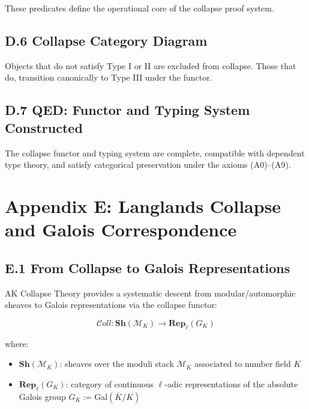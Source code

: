 \documentclass[11pt]{article}
\begin{document}
These predicates define the operational core of the collapse proof system.

\subsection*{D.6 Collapse Category Diagram}

\begin{center}
\end{center}

Objects that do not satisfy Type I or II are excluded from collapse.  
Those that do, transition canonically to Type III under the functor.

\subsection*{D.7 QED: Functor and Typing System Constructed}

The collapse functor and typing system are complete, compatible with dependent type theory, and satisfy categorical preservation under the axioms (A0)–(A9).



\appendix
\section*{Appendix E: Langlands Collapse and Galois Correspondence}

\subsection*{E.1 From Collapse to Galois Representations}

AK Collapse Theory provides a systematic descent from modular/automorphic sheaves to Galois representations via the collapse functor:

\[
\mathcal{C}oll : \mathbf{Sh}(\mathcal{M}_K) \longrightarrow \mathbf{Rep}_{\ell}(G_K)
\]

where:
\begin{itemize}
    \item \( \mathbf{Sh}(\mathcal{M}_K) \): sheaves over the moduli stack \( \mathcal{M}_K \) associated to number field \( K \)
    \item \( \mathbf{Rep}_{\ell}(G_K) \): category of continuous \( \ell \)-adic representations of the absolute Galois group \( G_K := \mathrm{Gal}(\overline{K}/K) \)
\end{itemize}
\end{document}
